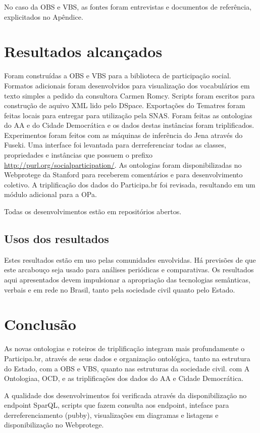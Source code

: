 \documentclass[12pt]{article}
\begin{document}
No caso da OBS e VBS, as fontes foram entrevistas e documentos de referência, explicitados no Apêndice.

\section{Resultados alcançados}
Foram construídas a OBS e VBS para a biblioteca de participação social. Formatos adicionais foram desenvolvidos para visualização dos vocabulários em texto simples a pedido da consultora Carmen Romcy. Scripts foram escritos para construção de aquivo XML lido pelo DSpace. Exportações do Tematres foram feitas locais para entregar para utilização pela SNAS. Foram feitas as ontologias do AA e do Cidade Democrática e os dados destas instâncias foram triplificados. Experimentos foram feitos com as máquinas de inferência do Jena através do Fuseki. Uma interface foi levantada para derreferenciar todas as classes, propriedades e instâncias que possuem o prefixo \url{http://purl.org/socialparticipation/}. As ontologias foram disponibilizadas no Webprotege da Stanford para receberem comentários e para desenvolvimento coletivo. A triplificação dos dados do Participa.br foi revisada, resultando em um módulo adicional para a OPa. 

Todas os desenvolvimentos estão em repositórios abertos.
\subsection{Usos dos resultados}\label{sec:uso}
Estes resultados estão em uso pelas comunidades envolvidas. Há previsões de que este arcabouço seja usado para análises periódicas e comparativas. Os resultados aqui apresentados devem impulsionar a apropriação das tecnologias semânticas, verbais e em rede no Brasil, tanto pela sociedade civil quanto pelo Estado.

\section{Conclusão}
As novas ontologias e roteiros de triplificação integram mais profundamente o Participa.br, através de seus dados e organização ontológica, 
tanto na estrutura do Estado, com a OBS e VBS, quanto nas estruturas da sociedade civil. com A Ontologiaa, OCD, e as triplificações dos dados do AA e Cidade Democrática.

A qualidade dos desenvolvimentos foi verificada através da disponibilização no endpoint SparQL, scripts que fazem consulta aos endpoint, inteface para derreferenciamento (pubby), visualizações em diagramas e listagens e disponibilização no Webprotege.
\end{document}
